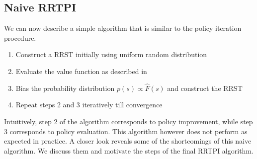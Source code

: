 \documentclass[wcp]{jmlr}
\begin{document}
\subsection*{Naive RRTPI}
We can now describe a simple algorithm that is similar to the policy iteration procedure.\\
\begin{enumerate}
\item Construct a RRST initially using uniform random distribution
\item Evaluate the value function as described in 
\item Bias the probability distribution $p(s) \varpropto \hat{F}(s)$  and construct the RRST
\item Repeat steps 2 and 3 iteratively till convergence
\end{enumerate}
Intuitively, step 2 of the algorithm corresponds to policy improvement, while step 3 corresponds to policy evaluation. This algorithm however does not perform as expected in practice. A closer look reveals some of the shortcomings of this naive algorithm. We discuss them and motivate the steps of the final RRTPI algorithm.
\end{document}

